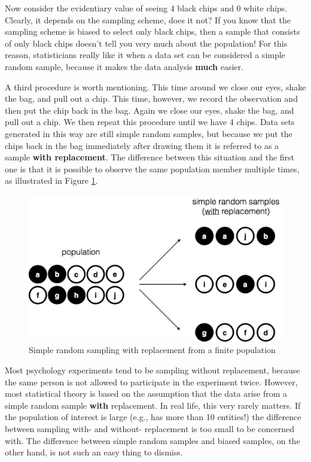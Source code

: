 \documentclass[]{book}
\begin{document}
Now consider the evidentiary value of seeing 4 black chips and 0 white chips. Clearly, it depends on the sampling scheme, does it not? If you know that the sampling scheme is biased to select only black chips, then a sample that consists of only black chips doesn't tell you very much about the population! For this reason, statisticians really like it when a data set can be considered a simple random sample, because it makes the data analysis \textbf{much} easier.

A third procedure is worth mentioning. This time around we close our eyes, shake the bag, and pull out a chip. This time, however, we record the observation and then put the chip back in the bag. Again we close our eyes, shake the bag, and pull out a chip. We then repeat this procedure until we have 4 chips. Data sets generated in this way are still simple random samples, but because we put the chips back in the bag immediately after drawing them it is referred to as a sample \textbf{with replacement}. The difference between this situation and the first one is that it is possible to observe the same population member multiple times, as illustrated in Figure \ref{fig:srs2}.

\begin{figure}
\centering
\includegraphics{navarro_img/estimation/srs2.pdf}
\caption{\label{fig:srs2}Simple random sampling with replacement from a finite population}
\end{figure}

Most psychology experiments tend to be sampling without replacement, because the same person is not allowed to participate in the experiment twice. However, most statistical theory is based on the assumption that the data arise from a simple random sample \textbf{with} replacement. In real life, this very rarely matters. If the population of interest is large (e.g., has more than 10 entities!) the difference between sampling with- and without- replacement is too small to be concerned with. The difference between simple random samples and biased samples, on the other hand, is not such an easy thing to dismiss.
\end{document}
